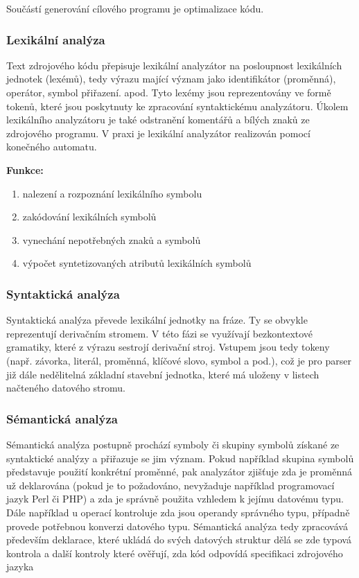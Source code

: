 Součástí generování cílového programu je optimalizace kódu.

\subsubsection{Lexikální analýza}
Text zdrojového kódu přepisuje lexikální analyzátor na posloupnost lexikálních jednotek (lexémů), tedy výrazu mající význam jako identifikátor (proměnná), operátor, symbol přiřazení. apod. Tyto lexémy jsou reprezentovány ve formě tokenů, které jsou poskytnuty ke zpracování syntaktickému analyzátoru. Úkolem lexikálního analyzátoru je také odstranění komentářů a bílých znaků ze zdrojového programu. V praxi je lexikální analyzátor realizován pomocí konečného automatu.

\textbf{Funkce:}
\begin{enumerate}
\item nalezení a rozpoznání lexikálního symbolu 
\item zakódování lexikálních symbolů
\item vynechání nepotřebných znaků a symbolů
\item výpočet syntetizovaných atributů lexikálních symbolů
\end{enumerate}

\subsubsection{Syntaktická analýza}
Syntaktická analýza převede lexikální jednotky na fráze. Ty se obvykle reprezentují derivačním stromem. V této fázi se využívají bezkontextové gramatiky, které z výrazu sestrojí derivační stroj. Vstupem jsou tedy tokeny (např. závorka, literál, proměnná, klíčové slovo, symbol a pod.), což je pro parser již dále nedělitelná základní stavební jednotka, které má uloženy v listech načteného datového stromu.

\subsubsection{Sémantická analýza}
Sémantická analýza postupně prochází symboly či skupiny symbolů získané ze syntaktické analýzy a přiřazuje se jim význam. Pokud například skupina symbolů představuje použití konkrétní proměnné, pak analyzátor zjišťuje zda je proměnná už deklarována (pokud je to požadováno, nevyžaduje například programovací jazyk Perl či PHP) a zda je správně použita vzhledem k jejímu datovému typu. Dále například u operací kontroluje zda jsou operandy správného typu, případně provede potřebnou konverzi datového typu. Sémantická analýza tedy zpracovává především deklarace, které ukládá do svých datových struktur dělá se zde typová kontrola a další kontroly které ověřují, zda kód odpovídá specifikaci zdrojového jazyka

